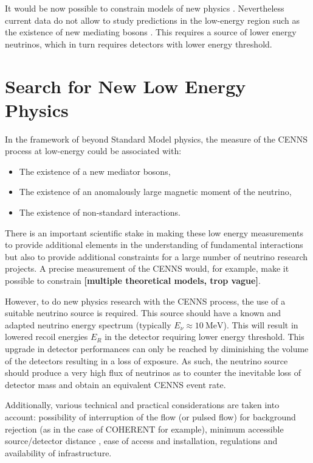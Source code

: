 It would be now possible to constrain models of new physics \cite{Akimov:2017bs}. Nevertheless current data do not allow to study predictions in the low-energy region such as the existence of new mediating bosons \cite{Billard:2018jnl}. This requires a source of lower energy neutrinos, which in turn requires detectors with lower energy threshold.


\section{Search for New Low Energy Physics}

In the framework of beyond Standard Model physics, the measure of the CENNS process at low-energy could be associated with:
\begin{itemize}
	\item The existence of a new  mediator bosons,
	\item The existence of an anomalously large magnetic moment of the neutrino,
	\item The existence of non-standard interactions.
\end{itemize}

There is an important scientific stake in making these low energy measurements to provide additional elements in the understanding of fundamental interactions but also to provide additional constraints for a large number of neutrino research projects. A precise measurement of the CENNS would, for example, make it possible to constrain \textbf{[multiple theoretical models, trop vague]}. 

However, to do new physics research with the CENNS process, the use of a suitable neutrino source is required. This source should have a known and adapted neutrino energy spectrum (typically $E_{\nu} \approx \SI{10}{\mega\eV}$). This will result in lowered recoil energies $E_R$ in the detector requiring lower energy threshold. This upgrade in detector performances can only be reached by diminishing the volume of the detectors resulting in a loss of exposure. As such, the neutrino source should produce a very high flux of neutrinos as to counter the inevitable loss of detector mass and obtain an equivalent CENNS event rate.

Additionally, various technical and practical considerations are taken into account: possibility of interruption of the flow (or pulsed flow) for background rejection (as in the case of COHERENT for example), minimum accessible source/detector distance
, ease of access and installation, regulations and availability of infrastructure.

